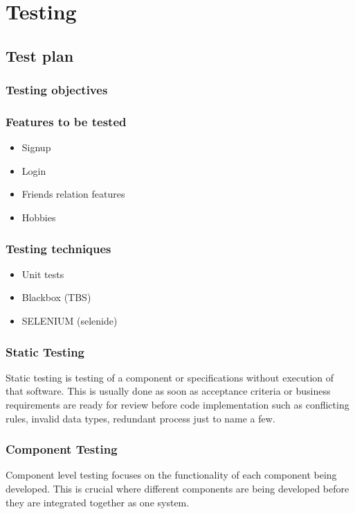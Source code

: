 \documentclass[a4paper]{article}
\begin{document}
\section{Testing}

\subsection{Test plan}
\subsubsection{Testing objectives}
\subsubsection{Features to be tested}
\begin{itemize}

\item Signup
\item Login
\item Friends relation features
\item Hobbies

\end{itemize}
\subsubsection{Testing techniques}
\begin{itemize}

\item Unit tests
\item Blackbox (TBS)
\item SELENIUM (selenide)
\end{itemize}

\subsubsection{Static Testing}
Static testing is testing of a component or specifications without execution of that software.  This is usually done as soon as acceptance criteria or business requirements are ready for review before code implementation such as conflicting rules, invalid data types, redundant process just to name a few. 
\subsubsection{Component Testing}
Component level testing focuses on the functionality of each component being developed.  This is  crucial where different components are being developed before they are integrated together as one system.
\end{document}
